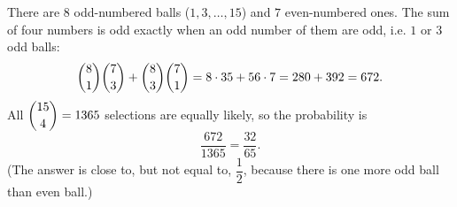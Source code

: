 There are $8$ odd-numbered balls ($1,3,\dots,15$) and $7$ even-numbered ones. The sum of four numbers is odd exactly when an odd number of them are odd, i.e. $1$ or $3$ odd balls:
\[\dbinom81\dbinom73+\dbinom83\dbinom71=8\cdot35+56\cdot7=280+392=672.\]
All $\dbinom{15}{4}=1365$ selections are equally likely, so the probability is
\[\dfrac{672}{1365}=\boxed{\dfrac{32}{65}}.\]
(The answer is close to, but not equal to, $\dfrac12$, because there is one more odd ball than even ball.)
